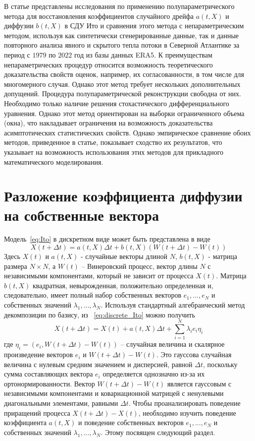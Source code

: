 В статье представлены исследования по применению полупараметрического метода для восстановления коэффициентов случайного дрейфа $a(t,X)$ и диффузии $b(t,X)$ в СДУ Ито и сравнения этого метода с непараметрическим методом, используя как синтетически сгенерированные данные, так и данные повторного анализа явного и скрытого тепла потоки в Северной Атлантике за период с $1979$ по $2022$ год из базы данных ERA5.
К преимуществам непараметрических процедур относится возможность теоретического доказательства свойств оценок, например, их согласованности, в том числе для многомерного случая. Однако этот метод требует нескольких дополнительных допущений. Процедура полупараметрической реконструкции свободна от них. Необходимо только наличие решения стохастического дифференциального уравнения. Однако этот метод ориентирован на выборки ограниченного объема (окна), что накладывает ограничения на возможность доказательства асимптотических статистических свойств. Однако эмпирическое сравнение обоих методов, приведенное в статье, показывает сходство их результатов, что указывает на возможность использования этих методов для прикладного математического моделирования.

\section{Разложение коэффициента диффузии на собственные вектора}
\label{sec:Karhunen}

Модель~\eqref{eq:Ito} в дискретном виде может быть представлена в виде
\begin{equation}
	\label{eq:discrete_Ito}
	X(t+\Delta t) = a(t,X) \Delta t + b(t,X) (W (t+\Delta t)-W(t))	
\end{equation}
Здесь $X(t)$ и $a(t,X)$ - случайные векторы длиной $N$, $b(t,X)$ - матрица размера $N\times N$, а $W(t)$ -- Винеровский процесс, вектор длины $N$ с независимыми компонентами, который не зависит от процесса $X(t)$. Матрица $b(t,X)$ квадратная, невырожденная, положительно определенная и, следовательно, имеет полный набор собственных векторов $e_1,...,e_N$ и собственных значений $\lambda_1,...,\lambda_N$. Используя стандартный алгебраический метод декомпозиции по базису, из ~\eqref{eq:discrete_Ito} можно получить
\begin{equation}
	\label{eq:decomposition}
	X(t+\Delta t) = X(t) + a(t,X) \Delta t + \sum_{i=1}^N \lambda_i e_i \eta_i
\end{equation}
где $\eta_i= (e_i,W(t+\Delta t)-W(t))$ -- случайная величина и скалярное произведение векторов $e_i$ и $W(t+\Delta t)-W(t)$. Это гауссова случайная величина с нулевым средним значением и дисперсией, равной $\Delta t$, поскольку сумма составляющих вектора $e_i$ определяется однозначно из-за их ортонормированности. Вектор $W (t + \Delta t)-W (t)$ является гауссовым с независимыми компонентами и ковариационной матрицей с ненулевыми диагональными элементами, равными $\Delta t$. Чтобы проанализировать поведение приращений процесса $X(t+\Delta t) - X(t)$, необходимо изучить поведение коэффициента $a(t,X)$ и поведение собственных векторов $e_1,...,e_N$ и собственных значений $\lambda_1,...,\lambda_N$. Этому посвящен следующий раздел.

